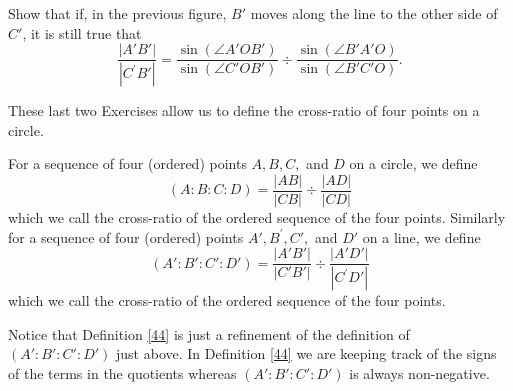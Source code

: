 \documentclass{ximera}
\begin{document}
\begin{exercise}\label{49}
Show that if, in the previous figure, $B'$ moves
along the line to the other side of $C'$, it is still true that%
\[
\frac{\left\vert A'B'\right\vert }{\left\vert C^{\prime
}B'\right\vert }=\frac{\sin\left(  \angle A'%
OB'\right)  }{\sin\left(  \angle C'OB'\right)
}\div\frac{\sin\left(  \angle B'A'O\right)
}{\sin\left(  \angle B'C'O\right)  }.
\]
\begin{solution}
\end{solution}
\end{exercise}

These last two Exercises allow us to define the cross-ratio of four
points on a circle.

\begin{definition}
For a sequence of four (ordered) points $A,B,C,$ and $D$ on a circle,
we define%
\[
\left(  A:B:C:D\right)  =\frac{\left\vert AB\right\vert }{\left\vert
CB\right\vert }\div\frac{\left\vert AD\right\vert }{\left\vert CD\right\vert }%
\]
which we call the cross-ratio of the ordered sequence of the four points.
Similarly for a sequence of four (ordered) points $A',B^{\prime
},C',$ and $D'$ on a line, we define%
\[
\left(  A':B':C':D'\right)  =\frac{\left\vert
A'B'\right\vert }{\left\vert C'B'\right\vert
}\div\frac{\left\vert A'D'\right\vert }{\left\vert C^{\prime
}D'\right\vert }%
\]
which we call the cross-ratio of the ordered sequence of the four points.
\end{definition}

Notice that Definition \ref{44} is just a refinement of the definition
of $\left( A':B':C':D'\right) $ just above. In Definition \ref{44} we
are keeping track of the signs of the terms in the quotients whereas
$\left( A':B':C':D'\right)$ is always non-negative.
\end{document}

